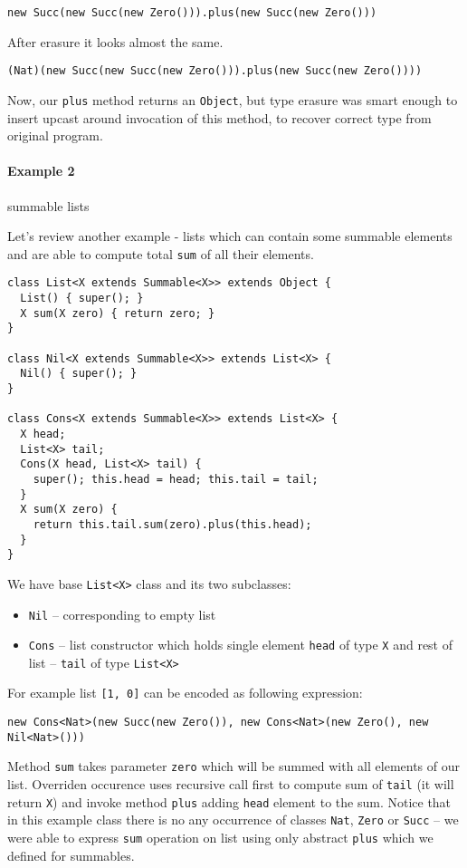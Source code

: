 \documentclass{article}[12pt]
\begin{document}
\begin{verbatim}
new Succ(new Succ(new Zero())).plus(new Succ(new Zero()))
\end{verbatim}
After erasure it looks almost the same.
\begin{verbatim}
(Nat)(new Succ(new Succ(new Zero())).plus(new Succ(new Zero())))
\end{verbatim}

Now, our \texttt{plus} method returns an \texttt{Object}, but type erasure was smart enough to insert upcast around invocation of this method, to recover correct type from original program.

\paragraph{Example 2} summable lists

Let's review another example - lists which can contain some summable elements and are able to compute total \texttt{sum} of all their elements.

\begin{verbatim}
class List<X extends Summable<X>> extends Object {
  List() { super(); }
  X sum(X zero) { return zero; }
}

class Nil<X extends Summable<X>> extends List<X> {
  Nil() { super(); }
}

class Cons<X extends Summable<X>> extends List<X> {
  X head;
  List<X> tail;
  Cons(X head, List<X> tail) {
    super(); this.head = head; this.tail = tail;
  }
  X sum(X zero) {
    return this.tail.sum(zero).plus(this.head);
  }
}
\end{verbatim}
We have base \texttt{List<X>} class and its two subclasses:
\begin{itemize}
\item \texttt{Nil} -- corresponding to empty list
\item \texttt{Cons} -- list constructor which holds single element \texttt{head} of type \texttt{X} and rest of list -- \texttt{tail} of type \texttt{List<X>}
\end{itemize}
For example list \texttt{[1, 0]} can be encoded as following expression:

\begin{verbatim}
new Cons<Nat>(new Succ(new Zero()), new Cons<Nat>(new Zero(), new Nil<Nat>()))
\end{verbatim}

Method \texttt{sum} takes parameter \texttt{zero} which will be summed with all elements of our list. Overriden occurence uses recursive call first to compute sum of \texttt{tail} (it will return \texttt{X}) and invoke method \texttt{plus} adding \texttt{head} element to the sum. Notice that in this example class there is no any occurrence of classes \texttt{Nat}, \texttt{Zero} or \texttt{Succ} -- we were able to express \texttt{sum} operation on list using only abstract \texttt{plus} which we defined for summables.
\end{document}
